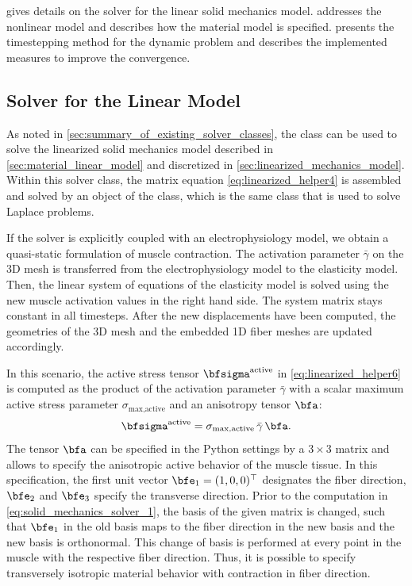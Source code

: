  gives details on the solver for the linear solid mechanics model.  addresses the nonlinear model and describes how the material model is specified.  presents the timestepping method for the dynamic problem and describes the implemented measures to improve the convergence.

\subsection{Solver for the Linear Model}\label{sec:solver_linear_model_elasticity}
As noted in \cref{sec:summary_of_existing_solver_classes}, the  class can be used to solve the linearized solid mechanics model described in \cref{sec:material_linear_model} and discretized in \cref{sec:linearized_mechanics_model}. 
Within this solver class, the matrix equation \cref{eq:linearized_helper4} is assembled and solved by an object of the  class, which is the same class that is used to solve  Laplace problems.

If the solver is explicitly coupled with an electrophysiology model, we obtain a quasi-static formulation of muscle contraction. The activation parameter $\bar{\gamma}$ on the 3D mesh is transferred from the electrophysiology model to the elasticity model.
Then, the linear system of equations of the elasticity model is solved using the new muscle activation values in the right hand side. The system matrix stays constant in all timesteps. After the new displacements have been computed, the geometries of the 3D mesh and the embedded 1D fiber meshes are updated accordingly.

In this scenario, the active stress tensor $\bfsigma^\text{active}$ in \cref{eq:linearized_helper6} is computed as the product of the activation parameter $\bar{\gamma}$ with a scalar maximum active stress parameter $\sigma_\text{max,active}$ and an anisotropy tensor $\bfa$:
\begin{align}\label{eq:solid_mechanics_solver_1}
  \bfsigma^\text{active} = \sigma_\text{max,active} \,\bar{\gamma}\,\bfa.
\end{align}
The tensor $\bfa$ can be specified in the Python settings by a $3 \times 3$ matrix and allows to specify the anisotropic active behavior of the muscle tissue. In this specification, the first unit vector $\bfe_1=(1,0,0)^\top$ designates the fiber direction, $\bfe_2$ and $\bfe_3$ specify the transverse direction. Prior to the computation in \cref{eq:solid_mechanics_solver_1}, the basis of the given matrix is changed, such that $\bfe_1$ in the old basis maps to the fiber direction in the new basis and the new basis is orthonormal. This change of basis is performed at every point in the muscle with the respective fiber direction. Thus, it is possible to specify transversely isotropic material behavior with contraction in fiber direction.

